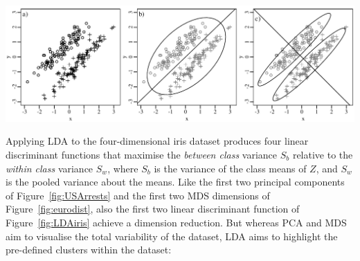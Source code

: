\noindent\includegraphics[width=\linewidth]{../figures/PCAvsLDA.pdf}
\begingroup {}
\label{fig:PCAvsLDA}
\endgroup

Applying LDA to the four-dimensional iris dataset produces four linear
discriminant functions that maximise the \textit{between class}
variance $S_b$ relative to the \textit{within class} variance $S_w$,
where $S_b$ is the variance of the class means of $Z$, and $S_w$ is
the pooled variance about the means. Like the first two principal
components of Figure~\ref{fig:USArrests} and the first two MDS
dimensions of Figure~\ref{fig:eurodist}, also the first two linear
discriminant function of Figure~\ref{fig:LDAiris} achieve a dimension
reduction. But whereas PCA and MDS aim to visualise the total
variability of the dataset, LDA aims to highlight the pre-defined
clusters within the dataset:

